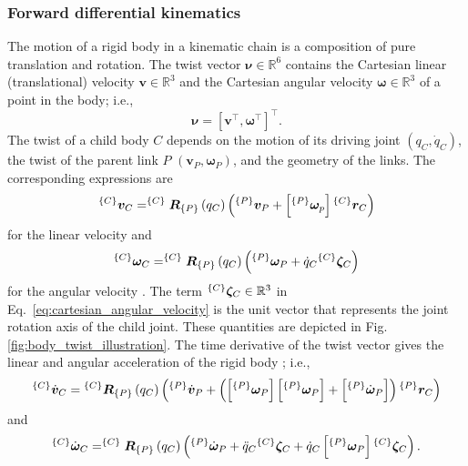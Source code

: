 \subsubsection{Forward differential kinematics}
The motion of a rigid body in a kinematic chain is a composition of pure translation and rotation. The twist vector $\bm{\nu}\in \mathbb{R}^6$ contains the Cartesian linear (translational) velocity $\bm{v}\in \mathbb{R}^3$ and the Cartesian angular velocity $\bm{\omega}\in \mathbb{R}^3$ of a point in the body; i.e., 
\begin{equation*}
	\bm{\nu} = \left[\bm{v}^\intercal, \bm{\omega}^\intercal\right]^\intercal.
\end{equation*}
The twist of a child body $C$ depends on the motion of its driving joint $(q_C,\dot{q}_C)$, the twist of the parent link $P$ $\left(\bm{v}_P,\bm{\omega}_P\right)$, and the geometry of the links. The corresponding expressions are
\begin{equation}\label{eq:cartesian_linear_velocity}
	^{\left\lbrace C \right\rbrace}\bm{v}_C = ^{\left\lbrace C \right\rbrace}\bm{R}_{\left\lbrace P \right\rbrace}\left(q_C\right)\left(^{\left\lbrace P \right\rbrace}\bm{v}_P + \left[^{\left\lbrace P \right\rbrace}\bm{\omega}_p\right] {}^{\left\lbrace C \right\rbrace}\bm{r}_C\right)
\end{equation}
for the linear velocity and 
\begin{equation}\label{eq:cartesian_angular_velocity}
	^{\left\lbrace C \right\rbrace}\bm{\omega}_C = ^{\left\lbrace C \right\rbrace}\bm{R}_{\left\lbrace P \right\rbrace}\left(q_C\right)\left(^{\left\lbrace P \right\rbrace}\bm{\omega}_P + \dot{q}_C{}^{\left\lbrace C \right\rbrace}\bm{\zeta}_C\right)
\end{equation}
for the angular velocity \cite{Featherstone2007RigidBodyDynamics}. The term $^{\left\lbrace C \right\rbrace}\bm{\zeta}_C \in \mathbb{R}^3$ in Eq.~\eqref{eq:cartesian_angular_velocity} is the unit vector that represents the joint rotation axis of the child joint. These quantities are depicted in Fig.~	\ref{fig:body_twist_illustration}. The time derivative of the twist vector gives the linear and angular acceleration of the rigid body \cite{Siciliano2008RoboticsModellingPlanning}; i.e.,
\begin{equation}\label{eq:cartesian_linear_acceleration}
	^{\left\lbrace C \right\rbrace}\dot{\bm{v}}_C = {}^{\left\lbrace C \right\rbrace}\bm{R}_{\left\lbrace P \right\rbrace}\left(q_C\right)\left(^{\left\lbrace P \right\rbrace}\dot{\bm{v}}_P + \left(\left[^{\left\lbrace P \right\rbrace}\bm{\omega}_P\right]\left[^{\left\lbrace P \right\rbrace}\bm{\omega}_P\right] + \left[^{\left\lbrace P \right\rbrace}\dot{\bm{\omega}}_P\right]\right) {}^{\left\lbrace P \right\rbrace}\bm{r}_C\right) 
\end{equation}    
and
\begin{equation}\label{eq:cartesian_angular_acceleration}
	^{\left\lbrace C \right\rbrace}\dot{\bm{\omega}}_C = ^{\left\lbrace C \right\rbrace}\bm{R}_{\left\lbrace P \right\rbrace}\left(q_C\right)\left(^{\left\lbrace P \right\rbrace}\dot{\bm{\omega}}_P + \ddot{q}_C{}^{\left\lbrace C \right\rbrace}\bm{\zeta}_C + \dot{q}_C\left[^{\left\lbrace P \right\rbrace}\bm{\omega}_P\right]{}^{\left\lbrace C \right\rbrace}\bm{\zeta}_C\right).
\end{equation}

